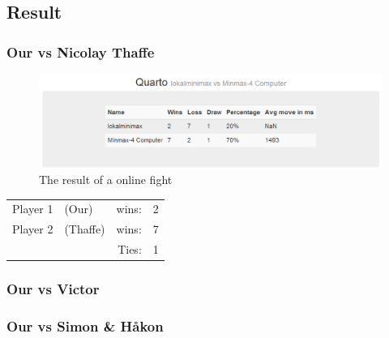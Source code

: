 \documentclass[12pt, a4paper]{article}
\begin{document}
\subsection{Result}
\subsubsection{Our vs Nicolay Thaffe}

\begin{figure}[h]

\includegraphics[width=19cm]{thaffe.png}
\caption{The result of a online fight}
\label{figure1}

\end{figure}


  \begin{tabular}{| l  l  r l |}
    \hline
 	Player 1 & (Our) & wins: & 2 \\
 	Player 2 & (Thaffe) & wins: & 7 \\
 	& &  Ties: & 1 \\
    \hline
  \end{tabular}

\subsubsection{Our vs Victor}

\subsubsection{Our vs Simon \& Håkon}
\end{document}
